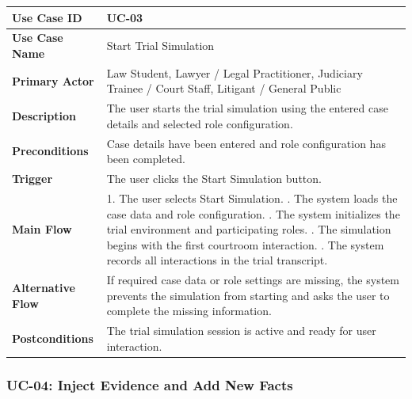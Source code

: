 \begin{longtable}{|p{4cm}|p{10cm}|}
\hline
\textbf{Use Case ID} & UC-03 \\ \hline
\textbf{Use Case Name} & Start Trial Simulation \\ \hline
\textbf{Primary Actor} & Law Student, Lawyer / Legal Practitioner, Judiciary Trainee / Court Staff, Litigant / General Public \\ \hline
\textbf{Description} & The user starts the trial simulation using the entered case details and selected role configuration. \\ \hline
\textbf{Preconditions} & Case details have been entered and role configuration has been completed. \\ \hline
\textbf{Trigger} & The user clicks the Start Simulation button. \\ \hline
\textbf{Main Flow} & 
1. The user selects Start Simulation. \newline
2. The system loads the case data and role configuration. \newline
3. The system initializes the trial environment and participating roles. \newline
4. The simulation begins with the first courtroom interaction. \newline
5. The system records all interactions in the trial transcript. \\ \hline
\textbf{Alternative Flow} & 
If required case data or role settings are missing, the system prevents the simulation from starting and asks the user to complete the missing information. \\ \hline
\textbf{Postconditions} & 
The trial simulation session is active and ready for user interaction. \\ \hline
\end{longtable}

\subsubsection{UC-04: Inject Evidence and Add New Facts}

